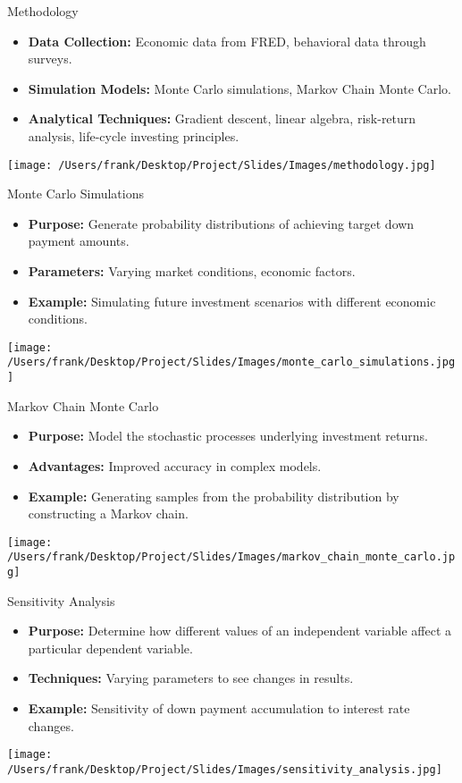 \documentclass{beamer}
\begin{document}
\begin{frame}{Methodology}
    \begin{itemize}
        \item \textbf{Data Collection:} Economic data from FRED, behavioral data through surveys.
        \item \textbf{Simulation Models:} Monte Carlo simulations, Markov Chain Monte Carlo.
        \item \textbf{Analytical Techniques:} Gradient descent, linear algebra, risk-return analysis, life-cycle investing principles.
    \end{itemize}
    \centering
    \texttt{[image: /Users/frank/Desktop/Project/Slides/Images/methodology.jpg]}
\end{frame}

\begin{frame}{Monte Carlo Simulations}
    \begin{itemize}
        \item \textbf{Purpose:} Generate probability distributions of achieving target down payment amounts.
        \item \textbf{Parameters:} Varying market conditions, economic factors.
        \item \textbf{Example:} Simulating future investment scenarios with different economic conditions.
    \end{itemize}
    \centering
    \texttt{[image: /Users/frank/Desktop/Project/Slides/Images/monte\_carlo\_simulations.jpg]}
\end{frame}

\begin{frame}{Markov Chain Monte Carlo}
    \begin{itemize}
        \item \textbf{Purpose:} Model the stochastic processes underlying investment returns.
        \item \textbf{Advantages:} Improved accuracy in complex models.
        \item \textbf{Example:} Generating samples from the probability distribution by constructing a Markov chain.
    \end{itemize}
    \centering
    \texttt{[image: /Users/frank/Desktop/Project/Slides/Images/markov\_chain\_monte\_carlo.jpg]}
\end{frame}

\begin{frame}{Sensitivity Analysis}
    \begin{itemize}
        \item \textbf{Purpose:} Determine how different values of an independent variable affect a particular dependent variable.
        \item \textbf{Techniques:} Varying parameters to see changes in results.
        \item \textbf{Example:} Sensitivity of down payment accumulation to interest rate changes.
    \end{itemize}
    \centering
    \texttt{[image: /Users/frank/Desktop/Project/Slides/Images/sensitivity\_analysis.jpg]}
\end{frame}
\end{document}
